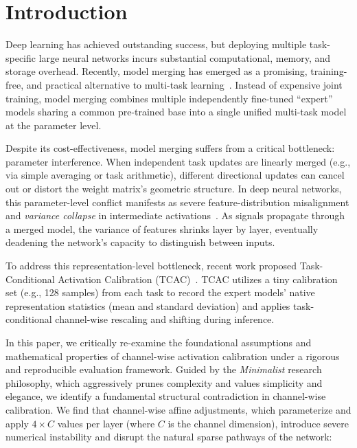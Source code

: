\documentclass{article}
\theoremstyle{plain}
\theoremstyle{definition}
\theoremstyle{remark}
\begin{document}
\printAffiliationsAndNotice{\icmlEqualContribution}

\section{Introduction}
\label{sec:intro}

Deep learning has achieved outstanding success, but deploying multiple task-specific large neural networks incurs substantial computational, memory, and storage overhead. Recently, model merging has emerged as a promising, training-free, and practical alternative to multi-task learning~\cite{ilharco2022editing, yadav2023ties, yu2024dare}. Instead of expensive joint training, model merging combines multiple independently fine-tuned ``expert'' models sharing a common pre-trained base into a single unified multi-task model at the parameter level.

Despite its cost-effectiveness, model merging suffers from a critical bottleneck: parameter interference. When independent task updates are linearly merged (e.g., via simple averaging or task arithmetic), different directional updates can cancel out or distort the weight matrix's geometric structure. In deep neural networks, this parameter-level conflict manifests as severe feature-distribution misalignment and \textit{variance collapse} in intermediate activations~\cite{jordan2022repair}. As signals propagate through a merged model, the variance of features shrinks layer by layer, eventually deadening the network's capacity to distinguish between inputs.

To address this representation-level bottleneck, recent work proposed Task-Conditional Activation Calibration (TCAC)~\cite{submission5}. TCAC utilizes a tiny calibration set (e.g., 128 samples) from each task to record the expert models' native representation statistics (mean and standard deviation) and applies task-conditional channel-wise rescaling and shifting during inference. 

In this paper, we critically re-examine the foundational assumptions and mathematical properties of channel-wise activation calibration under a rigorous and reproducible evaluation framework. Guided by the \textit{Minimalist} research philosophy, which aggressively prunes complexity and values simplicity and elegance, we identify a fundamental structural contradiction in channel-wise calibration. We find that channel-wise affine adjustments, which parameterize and apply $4 \times C$ values per layer (where $C$ is the channel dimension), introduce severe numerical instability and disrupt the natural sparse pathways of the network:
\end{document}
